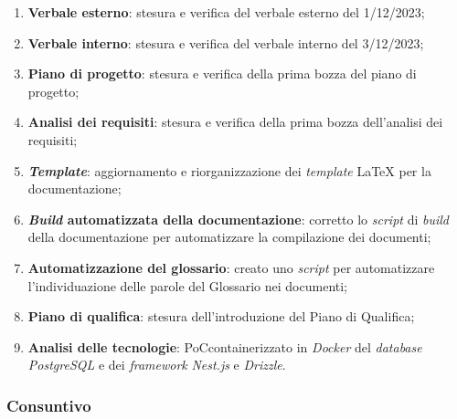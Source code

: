 \begin{enumerate}
	\item \textbf{Verbale esterno}: stesura e verifica del verbale esterno del
	      1/12/2023;

	\item \textbf{Verbale interno}: stesura e verifica del verbale interno del
	      3/12/2023;

	\item \textbf{Piano di progetto}: stesura e verifica della prima bozza del
	      piano di progetto;

	\item \textbf{Analisi dei requisiti}: stesura e verifica della prima bozza
	      dell'analisi dei requisiti;

	\item \textbf{\textit{Template}}: aggiornamento e riorganizzazione dei
	      \textit{template} LaTeX per la documentazione;

	\item \textbf{\textit{Build} automatizzata della documentazione}:
	      corretto lo \textit{script} di \textit{build} della documentazione per
	      automatizzare la compilazione dei documenti;

	\item \textbf{Automatizzazione del glossario}: creato uno \textit{script} per
	      automatizzare l'individuazione delle parole del Glossario nei
	      documenti;

	\item \textbf{Piano di qualifica}: stesura dell'introduzione del Piano
	      di Qualifica;

	\item \textbf{Analisi delle tecnologie}: PoC\g containerizzato in
	      \textit{Docker} del \textit{database} \textit{PostgreSQL} e dei
	      \textit{framework} \textit{Nest.js} e \textit{Drizzle}.
\end{enumerate}

\subsubsection{Consuntivo}

